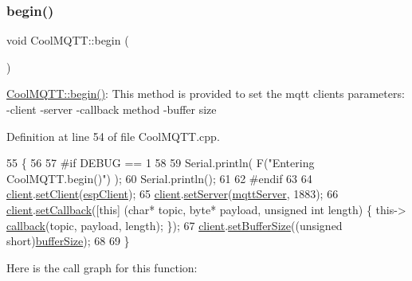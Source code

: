 \subsubsection{\texorpdfstring{begin()}{begin()}}
{\footnotesize\ttfamily void Cool\+M\+Q\+T\+T\+::begin (\begin{DoxyParamCaption}{ }\end{DoxyParamCaption})}

\hyperlink{class_cool_m_q_t_t_ac9248808641ebf3054ed0620ea9d0100}{Cool\+M\+Q\+T\+T\+::begin()}\+: This method is provided to set the mqtt client\textquotesingle{}s parameters\+: -\/client -\/server -\/callback method -\/buffer size 

Definition at line 54 of file Cool\+M\+Q\+T\+T.\+cpp.


\begin{DoxyCode}
55 \{ 
56 
57 \textcolor{preprocessor}{#if DEBUG == 1 }
58 
59     Serial.println( F(\textcolor{stringliteral}{"Entering CoolMQTT.begin()"}) );
60     Serial.println();
61 
62 \textcolor{preprocessor}{#endif}
63 
64     \hyperlink{class_cool_m_q_t_t_afed1372683c44893b4668d0f1771f514}{client}.\hyperlink{class_cool_pub_sub_client_a7ee119b786010561ab6a9afa0798e91d}{setClient}(\hyperlink{class_cool_m_q_t_t_acc30a0200967374a524092a8a806502a}{espClient});
65     \hyperlink{class_cool_m_q_t_t_afed1372683c44893b4668d0f1771f514}{client}.\hyperlink{class_cool_pub_sub_client_a947e70c394c66c7d08d0c53caf8425e3}{setServer}(\hyperlink{class_cool_m_q_t_t_ab8bb951f87ddbf92db74c2ad16a3e53e}{mqttServer}, 1883);    
66     \hyperlink{class_cool_m_q_t_t_afed1372683c44893b4668d0f1771f514}{client}.\hyperlink{class_cool_pub_sub_client_ac5cab7658f1bdded32131241e468e661}{setCallback}([\textcolor{keyword}{this}] (\textcolor{keywordtype}{char}* topic, byte* payload, \textcolor{keywordtype}{unsigned} \textcolor{keywordtype}{int} length) \{ this->
      \hyperlink{class_cool_m_q_t_t_a30d82ad665bfb603f46ecdbc290775df}{callback}(topic, payload, length); \});
67     \hyperlink{class_cool_m_q_t_t_afed1372683c44893b4668d0f1771f514}{client}.\hyperlink{class_cool_pub_sub_client_a4f83e54f1ba96e32f725d93cdec283b7}{setBufferSize}((\textcolor{keywordtype}{unsigned} \textcolor{keywordtype}{short})\hyperlink{class_cool_m_q_t_t_a7f3cf26b51d6770f216e42c5ef13ca9f}{bufferSize});
68 
69 \}
\end{DoxyCode}
Here is the call graph for this function\+:\nopagebreak
